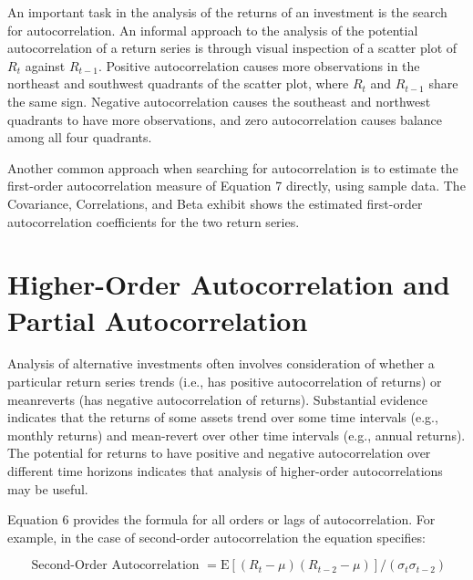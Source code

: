\documentclass[11pt]{article}
\begin{document}
An important task in the analysis of the returns of an investment is the search for autocorrelation. An informal approach to the analysis of the potential autocorrelation of a return series is through visual inspection of a scatter plot of $R_{t}$ against $R_{t-1}$. Positive autocorrelation causes more observations in the northeast and southwest quadrants of the scatter plot, where $R_{t}$ and $R_{t-1}$ share the same sign. Negative autocorrelation causes the southeast and northwest quadrants to have more observations, and zero autocorrelation causes balance among all four quadrants.

Another common approach when searching for autocorrelation is to estimate the first-order autocorrelation measure of Equation 7 directly, using sample data. The Covariance, Correlations, and Beta exhibit shows the estimated first-order autocorrelation coefficients for the two return series.

\section*{Higher-Order Autocorrelation and Partial Autocorrelation}
Analysis of alternative investments often involves consideration of whether a particular return series trends (i.e., has positive autocorrelation of returns) or meanreverts (has negative autocorrelation of returns). Substantial evidence indicates that the returns of some assets trend over some time intervals (e.g., monthly returns) and mean-revert over other time intervals (e.g., annual returns). The potential for returns to have positive and negative autocorrelation over different time horizons indicates that analysis of higher-order autocorrelations may be useful.

Equation 6 provides the formula for all orders or lags of autocorrelation. For example, in the case of second-order autocorrelation the equation specifies:

$$
\text { Second-Order Autocorrelation }=\mathrm{E}\left[\left(R_{t}-\mu\right)\left(R_{t-2}-\mu\right)\right] /\left(\sigma_{t} \sigma_{t-2}\right)
$$
\end{document}
